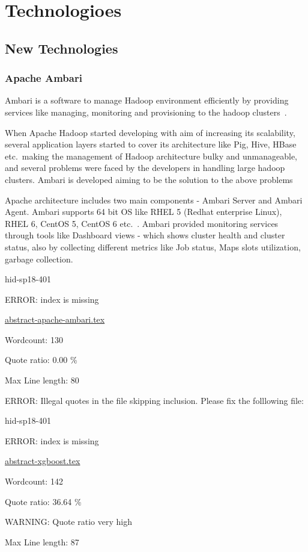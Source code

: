 \part{Technologioes}
\chapter{New Technologies}
\section{Apache Ambari}  

Ambari is a software  to manage Hadoop environment
efficiently by providing services like managing, monitoring and provisioning to
the hadoop clusters~\cite{hid-sp18-401-wiki-Ambari}.

When Apache Hadoop started developing with aim of increasing its scalability,
several application layers started to cover its architecture like Pig, Hive,
HBase etc.\ making the management of Hadoop architecture bulky and unmanageable,
and several problems were faced by the developers in handling large hadoop
clusters. Ambari is developed aiming to be the solution to the above problems


Apache architecture includes two main components - Ambari Server and Ambari
Agent. Ambari supports 64 bit OS like RHEL 5 (Redhat enterprise Linux), RHEL 6,
CentOS 5, CentOS 6 etc.~\cite{hid-sp18-401-Ambari}. Ambari provided monitoring
services through tools like Dashboard views - which shows cluster health and
cluster status, also by collecting different metrics like Job status, Maps slots
utilization, garbage collection.



\begin{IU}

hid-sp18-401

ERROR: index is missing

\href{https://github.com/cloudmesh-community/hid-sp18-401/blob/master//technology/abstract-apache-ambari.tex}{abstract-apache-ambari.tex}

 

Wordcount: 130


Quote ratio: 0.00 \%
 
Max Line length: 80
\end{IU}

ERROR: Illegal quotes in the file skipping inclusion. Please fix the folllowing file:

\begin{IU}

hid-sp18-401

ERROR: index is missing

\href{https://github.com/cloudmesh-community/hid-sp18-401/blob/master//technology/abstract-xgboost.tex}{abstract-xgboost.tex}

 

Wordcount: 142


Quote ratio: 36.64 \%

WARNING: Quote ratio very high
 
Max Line length: 87
\end{IU}

